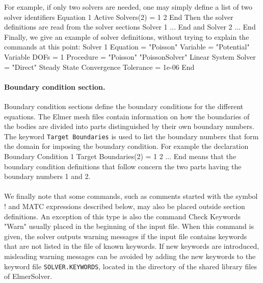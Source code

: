 For example, if only two solvers are needed, one may simply define a list of two solver identifiers 
\ttbegin
Equation 1
  Active Solvers(2) = 1 2
End
\ttend
Then the solver definitions are read from the solver sections 
\ttbegin
Solver 1
  ...
End
\ttend
and 
\ttbegin
Solver 2
  ...
End
\ttend
Finally, we give an example of solver definitions, without trying to explain the commands at this point:
\ttbegin
Solver 1
 Equation = "Poisson"
 Variable = "Potential"
 Variable DOFs = 1
 Procedure = "Poisson" "PoissonSolver"
 Linear System Solver = "Direct"
 Steady State Convergence Tolerance = 1e-06
End
\ttend

\paragraph{Boundary condition section.}Boundary condition sections define the boundary conditions for the different
equations. The Elmer mesh files contain information on how the boundaries of the bodies are divided
into parts distinguished by their own boundary numbers. The keyword {\tt Target Boundaries} is used to list 
the boundary numbers that form the domain for imposing the boundary condition. 
For example the declaration 
\ttbegin
Boundary  Condition 1
  Target Boundaries(2) = 1 2
  ...
End
\ttend
means that the boundary condition definitions that follow concern the two parts having the boundary numbers 1 and 2.

\paragraph{}
We finally note that some commands, such as comments started with the symbol ! and MATC expressions described below, 
may also be placed outside section definitions. An exception of this type is also the command
\ttbegin
Check Keywords "Warn"
\ttend
usually placed in the beginning of the input file. When this command is given, the solver 
outputs warning messages if the input file contains keywords that are not listed in the file
of known keywords. If new keywords are introduced, misleading warning messages can be avoided
by adding the new keywords to the keyword file {\tt SOLVER.KEYWORDS}, located in the directory
of the shared library files of ElmerSolver. 
 
